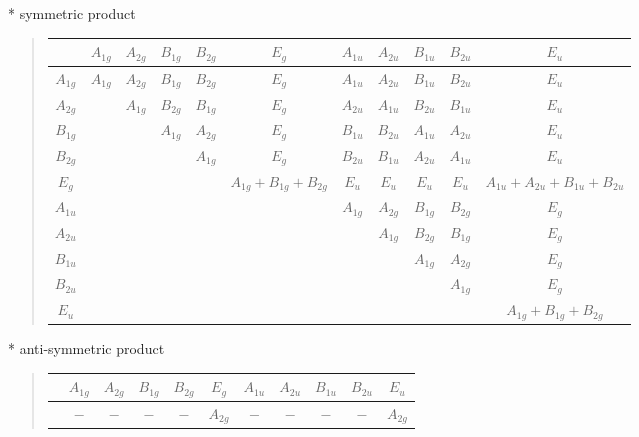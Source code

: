 \documentclass[fleqn,8pt,landscape]{jsarticle}
\begin{document}
* symmetric product
\begin{quote}
\begin{tabular}{c|cccccccccc} \hline \hline
 & $ A_{1g} $ & $ A_{2g} $ & $ B_{1g} $ & $ B_{2g} $ & $ E_{g} $ & $ A_{1u} $ & $ A_{2u} $ & $ B_{1u} $ & $ B_{2u} $ & $ E_{u} $ \\ \hline
$ A_{1g} $ & $ A_{1g} $ & $ A_{2g} $ & $ B_{1g} $ & $ B_{2g} $ & $ E_{g} $ & $ A_{1u} $ & $ A_{2u} $ & $ B_{1u} $ & $ B_{2u} $ & $ E_{u} $ \\
$ A_{2g} $ & $  $ & $ A_{1g} $ & $ B_{2g} $ & $ B_{1g} $ & $ E_{g} $ & $ A_{2u} $ & $ A_{1u} $ & $ B_{2u} $ & $ B_{1u} $ & $ E_{u} $ \\
$ B_{1g} $ & $  $ & $  $ & $ A_{1g} $ & $ A_{2g} $ & $ E_{g} $ & $ B_{1u} $ & $ B_{2u} $ & $ A_{1u} $ & $ A_{2u} $ & $ E_{u} $ \\
$ B_{2g} $ & $  $ & $  $ & $  $ & $ A_{1g} $ & $ E_{g} $ & $ B_{2u} $ & $ B_{1u} $ & $ A_{2u} $ & $ A_{1u} $ & $ E_{u} $ \\
$ E_{g} $ & $  $ & $  $ & $  $ & $  $ & $ A_{1g} + B_{1g} + B_{2g} $ & $ E_{u} $ & $ E_{u} $ & $ E_{u} $ & $ E_{u} $ & $ A_{1u} + A_{2u} + B_{1u} + B_{2u} $ \\
$ A_{1u} $ & $  $ & $  $ & $  $ & $  $ & $  $ & $ A_{1g} $ & $ A_{2g} $ & $ B_{1g} $ & $ B_{2g} $ & $ E_{g} $ \\
$ A_{2u} $ & $  $ & $  $ & $  $ & $  $ & $  $ & $  $ & $ A_{1g} $ & $ B_{2g} $ & $ B_{1g} $ & $ E_{g} $ \\
$ B_{1u} $ & $  $ & $  $ & $  $ & $  $ & $  $ & $  $ & $  $ & $ A_{1g} $ & $ A_{2g} $ & $ E_{g} $ \\
$ B_{2u} $ & $  $ & $  $ & $  $ & $  $ & $  $ & $  $ & $  $ & $  $ & $ A_{1g} $ & $ E_{g} $ \\
$ E_{u} $ & $  $ & $  $ & $  $ & $  $ & $  $ & $  $ & $  $ & $  $ & $  $ & $ A_{1g} + B_{1g} + B_{2g} $ \\
 \hline \hline
\end{tabular}
\end{quote}

* anti-symmetric product
\begin{quote}
\begin{tabular}{ccccccccccc} \hline \hline
 & $ A_{1g} $ & $ A_{2g} $ & $ B_{1g} $ & $ B_{2g} $ & $ E_{g} $ & $ A_{1u} $ & $ A_{2u} $ & $ B_{1u} $ & $ B_{2u} $ & $ E_{u} $ \\ \hline
$  $ & $ - $ & $ - $ & $ - $ & $ - $ & $ A_{2g} $ & $ - $ & $ - $ & $ - $ & $ - $ & $ A_{2g} $ \\
 \hline \hline
\end{tabular}
\end{quote}
\end{document}
